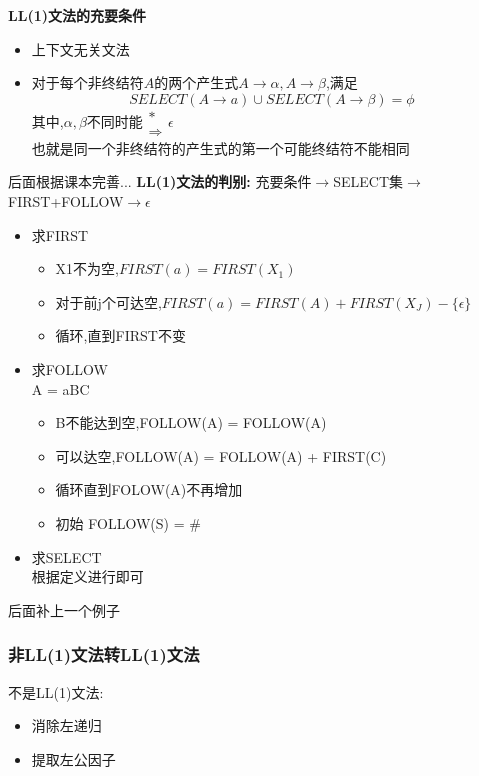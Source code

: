 \documentclass[UTF8,a4paper]{ctexart}
\newcommand{\spaceline}{\vspace{\baselineskip}}
\begin{document}
  \spaceline
  \textbf{LL(1)文法的充要条件}
  \begin{itemize}
    \item 上下文无关文法
    \item 对于每个非终结符$A$的两个产生式$A \to \alpha ,A \to \beta$,满足
    \[SELECT(A\to a) \cup SELECT(A \to \beta) = \phi\]
    其中,$\alpha , \beta$不同时能$\renewcommand{\arraystretch}{0.5} \begin{array}{c} * \\ \Rightarrow \end{array} \epsilon$\\
    {\color{blue}也就是同一个非终结符的产生式的第一个可能终结符不能相同}
  \end{itemize}

{\color{red}后面根据课本完善...}
\spaceline
\textbf{LL(1)文法的判别:}
充要条件$\to$SELECT集$\to$FIRST+FOLLOW$\to$$\epsilon$

\begin{itemize}
  \item 求FIRST\\
  \begin{itemize}
    \item X1不为空,$FIRST(a)=FIRST(X_1)$
    \item 对于前j个可达空,$FIRST(a) = FIRST(A) + FIRST(X_J) - \{\epsilon\}$
    \item 循环,直到FIRST不变
  \end{itemize}
  \item 求FOLLOW\\
  A = aBC
  \begin{itemize}
    \item B不能达到空,FOLLOW(A) = FOLLOW(A)
    \item 可以达空,FOLLOW(A) = FOLLOW(A) + FIRST(C)
    \item 循环直到FOLOW(A)不再增加
    \item 初始 FOLLOW(S) = {$\#$}
  \end{itemize}
  \item 求SELECT\\
  根据定义进行即可
\end{itemize}

{\color{red}后面补上一个例子}

\subsubsection{非LL(1)文法转LL(1)文法}
不是LL(1)文法:
\begin{itemize}
  \item 消除左递归
  \item 提取左公因子
\end{itemize}
\end{document}
